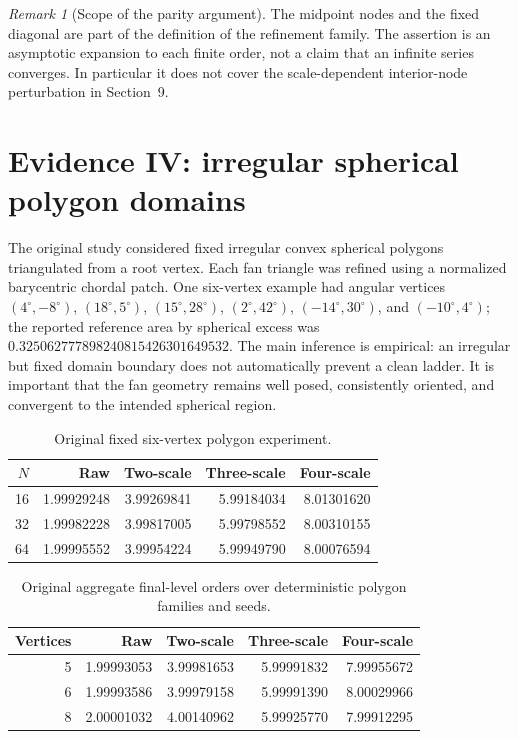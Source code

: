 \documentclass[11pt]{article}
\theoremstyle{remark}
\newtheorem{remark}{Remark}
\begin{document}
\begin{remark}[Scope of the parity argument]
The midpoint nodes and the fixed diagonal are part of the definition of the
refinement family. The assertion is an asymptotic expansion to each finite
order, not a claim that an infinite series converges. In particular it does
not cover the scale-dependent interior-node perturbation in Section~9.
\end{remark}

\section{Evidence IV: irregular spherical polygon domains}
The original study considered fixed irregular convex spherical polygons triangulated from a
root vertex. Each fan triangle was refined using a normalized barycentric chordal patch. One
six-vertex example had angular vertices $(4^\circ,-8^\circ)$, $(18^\circ,5^\circ)$,
$(15^\circ,28^\circ)$, $(2^\circ,42^\circ)$, $(-14^\circ,30^\circ)$, and $(-10^\circ,4^\circ)$;
the reported reference area by spherical excess was
$0.325062777898240815426301649532$. The main inference is empirical: an irregular but fixed
domain boundary does not automatically prevent a clean ladder. It is important that the fan
geometry remains well posed, consistently oriented, and convergent to the intended spherical
region.

\begin{table}[ht]
\centering
\begin{tabular}{rrrrr}
\toprule
$N$ & Raw & Two-scale & Three-scale & Four-scale\\
\midrule
16 & 1.99929248 & 3.99269841 & 5.99184034 & 8.01301620\\
32 & 1.99982228 & 3.99817005 & 5.99798552 & 8.00310155\\
64 & 1.99995552 & 3.99954224 & 5.99949790 & 8.00076594\\
\bottomrule
\end{tabular}
\caption{Original fixed six-vertex polygon experiment.}
\end{table}

\begin{table}[ht]
\centering
\begin{tabular}{rrrrr}
\toprule
Vertices & Raw & Two-scale & Three-scale & Four-scale\\
\midrule
5 & 1.99993053 & 3.99981653 & 5.99991832 & 7.99955672\\
6 & 1.99993586 & 3.99979158 & 5.99991390 & 8.00029966\\
8 & 2.00001032 & 4.00140962 & 5.99925770 & 7.99912295\\
\bottomrule
\end{tabular}
\caption{Original aggregate final-level orders over deterministic polygon families and seeds.}
\end{table}
\end{document}
